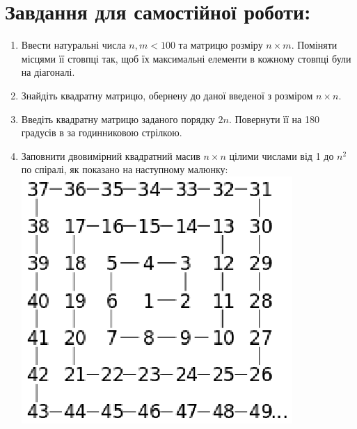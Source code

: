 \documentclass[a5paper,titlepage,openany,twoside,
]
{book_unv}%
\begin{document}
\section{Завдання для самостійної роботи:}

\begin{enumerate}
\def\labelenumi{\arabic{enumi})}
\setcounter{enumi}{6}
\item
  Ввести натуральні числа $n,m<100$ та матрицю розміру $n \times m$. 
  Поміняти місцями її стовпці так, щоб їх
  максимальні елементи в кожному стовпці були на діагоналі.
\item
  Знайдіть квадратну матрицю, обернену до даної введеної з розміром $n \times n$.
\item
  Введіть квадратну матрицю заданого порядку $2n$. Повернути її на 180 градусів в
  за годинниковою стрілкою.

\item
  Заповнити двовимірний квадратний масив $n\times n$ цілими числами від 1 до $n^2$ по
  спіралі, як показано на наступному малюнку:\\

\includegraphics{spiral5.eps} 
   

\end{enumerate}
\end{document}
